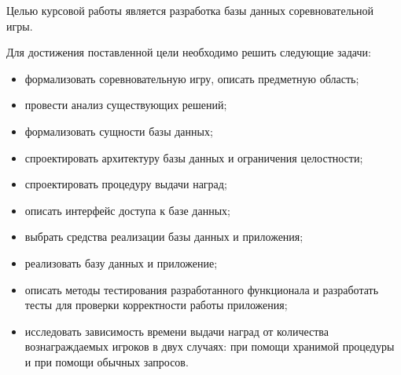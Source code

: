
Целью курсовой работы является разработка базы данных соревновательной игры.
 
Для достижения поставленной цели необходимо решить следующие задачи:
\begin{itemize}
	\item формализовать соревновательную игру, описать предметную область;
	\item провести анализ существующих решений;
	\item формализовать сущности базы данных;
	\item спроектировать архитектуру базы данных и ограничения целостности;
	\item спроектировать процедуру выдачи наград;
	\item описать интерфейс доступа к базе данных; 
	\item выбрать средства реализации базы данных и приложения;
	\item реализовать базу данных и приложение;
	\item описать методы тестирования разработанного функционала и разработать тесты для проверки корректности работы приложения;
	\item исследовать зависимость времени выдачи наград от количества вознаграждаемых игроков в двух случаях: при помощи хранимой процедуры и при помощи обычных запросов.
\end{itemize}

\clearpage
